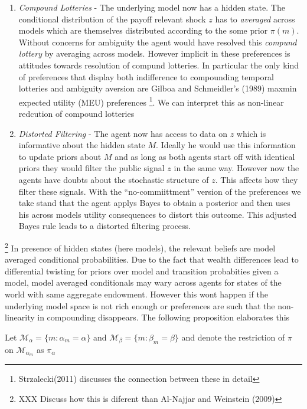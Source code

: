 \documentclass[12pt]{article}
\begin{document}
\begin{enumerate}
\item \emph{Compound Lotteries}  - The underlying model  now has a hidden state. The conditional distribution of the payoff relevant shock $z$  has to \emph{averaged} across models which are themselves distributed according to the some prior $\pi(m)$. Without concerns for ambiguity the agent would have resolved this \emph{compund lottery} by averaging across models. However implicit in these preferences is attitudes towards resolution of compund lotteries.  In particular the only kind of preferences that display both indifference to compounding temporal lotteries and ambiguity aversion are Gilboa and Schmeidler's (1989) maxmin expected utility (MEU) preferences \footnote{Strzalecki(2011) discusses the connection between these in detail}. We can interpret this as non-linear redcution of compound lotteries

\item \emph{Distorted Filtering } - The agent now has access to data on $z$ which is informative about the hidden state $M$. Ideally he would use this information to update priors about $M$ and as long as both agents start off with identical priors they would filter the public signal $z$ in the same way. However now the agents have doubts about the stochastic structure of $z$. This affects how they filter these signals. With the ``no-commiittment'' version of the preferences we take stand that the agent applys Bayes to obtain a posterior and then uses his across models utility consequences to distort this outcome. This adjusted Bayes rule leads to a distorted filtering process. 
\end{enumerate}
\footnote{XXX Discuss how this is diferent than Al-Najjar and Weinstein (2009)}
\noindent In presence of hidden states (here models), the relevant beliefs are model averaged conditional probabilities. Due to the fact that wealth differences lead to differential twisting for priors over model and transition probabities given a  model, model averaged conditionals may wary across agents for states of the world with same aggregate endowment. However this wont happen if the underlying model space is not rich enough or preferences are such that the non-linearity in compounding disappears. The following proposition elaborates this


\noindent Let $\mathcal{M}_{\alpha} = \{m : \alpha_m=\alpha\}$ and  $\mathcal{M}_{\beta} = \{m : \beta_m=\beta\}$ and denote the restriction of $\pi$ on  $\mathcal{M}_{\alpha_m}$ as $\pi_{\alpha}$
\end{document}
